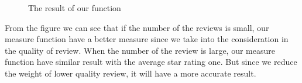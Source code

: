 \documentclass[12pt]{mcmthesis}
\begin{document}
\begin{figure}[htbp]
{	}
	\quad
	\caption{The result of our function}
\end{figure}
\newpage
From the figure we can see that if the number of the reviews is small, our measure function have a better measure since we take into the consideration in the quality of review. When the number of the review is large, our measure function have similar result with the average star rating one. But since we reduce the weight of lower quality review, it will have a more accurate result.
\end{document}
